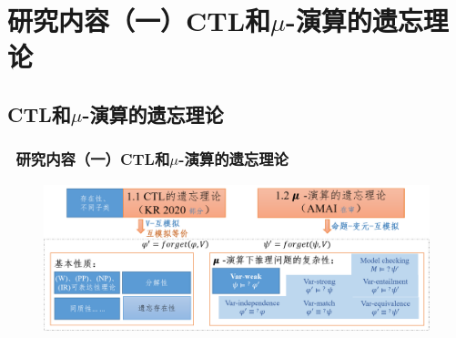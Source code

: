 \documentclass[aspectratio=1610, 9pt, CJK]{beamer}
\begin{document}
	
\section{研究内容（一）CTL和$\mu$-演算的遗忘理论}
\subsection{CTL和$\mu$-演算的遗忘理论}  
\begin{frame}  
	\frametitle{~研究内容（一）CTL和$\mu$-演算的遗忘理论}
	\begin{figure}
		\includegraphics[scale=0.45]{figures/ctlMuForgFrame111}
	\end{figure}

\end{frame}
\end{document}
